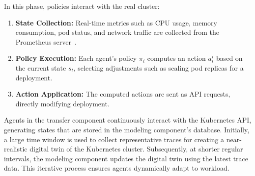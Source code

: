 \documentclass[conference]{IEEEtran}
\begin{document}

In this phase, policies interact with the real cluster:
\begin{enumerate}
    \item \textbf{State Collection:} Real-time metrics such as CPU usage, memory consumption, pod status, and network traffic are collected from the Prometheus server~\cite{prometheus}.
    \item \textbf{Policy Execution:} Each agent's policy $\pi_i$ computes an action $a_t^i$ based on the current state $s_t$, selecting adjustments such as scaling pod replicas for a deployment.
    \item \textbf{Action Application:} The computed actions are sent as API requests, directly modifying deployment.
\end{enumerate}

Agents in the transfer component continuously interact with the Kubernetes API, generating states that are stored in the modeling component's database. Initially, a large time window is used to collect representative traces for creating a near-realistic digital twin of the Kubernetes cluster. Subsequently, at shorter regular intervals, the modeling component updates the digital twin using the latest trace data. This iterative process ensures agents dynamically adapt to workload.


%


\end{document}
